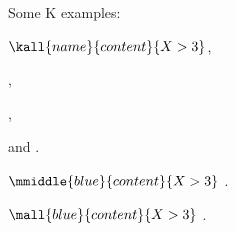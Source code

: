 \documentclass{fithesis3}
\begin{document}

\ifshowkexamples
Some K examples:

$\kall{name}{content}{X > 3}$,

,

,

and .

$\mmiddle{blue}{content}{X > 3}$
.

$\mall{blue}{content}{X > 3}$
.


\fi %

\fi %


 
\end{document}
